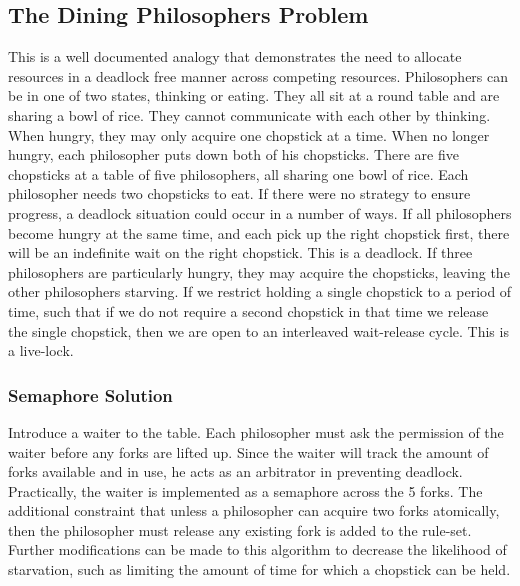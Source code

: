 \documentclass[10pt,a4paper]{article}
\begin{document}
\subsection{The Dining Philosophers Problem}
This is a well documented analogy that demonstrates the need to allocate resources in a deadlock free manner across competing resources. Philosophers  can be in one of two states, thinking or eating. They all sit at a round table and are sharing a bowl of rice. They cannot communicate with each other by thinking. When hungry, they may only acquire one chopstick at a time. When no longer hungry, each philosopher puts down both of his chopsticks. There are five chopsticks at a table of five philosophers, all sharing one bowl of rice. Each philosopher needs two chopsticks to eat. If there were no strategy to ensure progress, a deadlock situation could occur in a number of ways. If all philosophers become hungry at the same time, and each pick up the right chopstick first, there will be an indefinite wait on the right chopstick. This is a deadlock. If three philosophers are particularly hungry, they may acquire the chopsticks, leaving the other philosophers starving. If we restrict holding a single chopstick to a period of time, such that if we do not require a second chopstick in that time we release the single chopstick, then we are open to an interleaved wait-release cycle. This is a live-lock. 
\subsubsection{Semaphore Solution}
Introduce a waiter to the table. Each philosopher must ask the permission of the waiter before any forks are lifted up. Since the waiter will track the amount of forks available and in use, he acts as an arbitrator in preventing deadlock. Practically, the waiter is implemented as a semaphore across the 5 forks. The additional constraint that unless a philosopher can acquire two forks atomically, then the philosopher must release any existing fork is added to the rule-set. Further modifications can be made to this algorithm to decrease the likelihood of starvation, such as limiting the amount of time for which a chopstick can be  held. 
\end{document}
